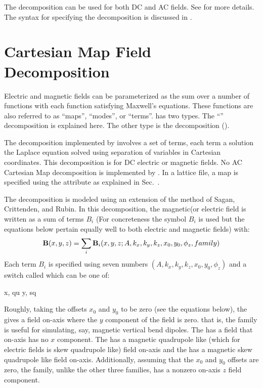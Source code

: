 The  decomposition can be used for both DC and AC fields. See
 for more details. The syntax for specifying the
 decomposition is discussed in .

\section{Cartesian Map Field Decomposition}
\label{s:cart.map.phys}

Electric and magnetic fields can be parameterized as the sum over a number of functions
with each function satisfying Maxwell's equations. These functions are also referred to as
``maps'', ``modes'', or ``terms''. \bmad has two types. The ``''
decomposition is explained here. The other type is the  decomposition
().

The  decomposition implemented by \bmad involves a set of terms, each
term a solution the Laplace equation solved using separation of variables in Cartesian
coordinates. This decomposition is for DC electric or magnetic fields. No AC Cartesian Map
decomposition is implemented by \bmad. In a lattice file, a  map is specified using
the  attribute as explained in Sec.~.

The  decomposition is modeled using an extension of the method of Sagan,
Crittenden, and Rubin\cite{b:wiggler}. In this decomposition, the magnetic(or electric
field is written as a sum of terms $B_i$ (For concreteness the symbol $B_i$ is used but
the equations below pertain equally well to both electric and magnetic fields) with:
\begin{equation}
  {\bf B}(x,y,z) = \sum_i {\bf B}_i(x, y, z; A, k_x, k_y, k_z, x_0, y_0, \phi_z, family)
\end{equation}
Each term $B_i$ is specified using seven numbers $(A, k_x, k_y, k_z,
x_0, y_0, \phi_z)$ and a switch called  which can be one of:
\begin{example}
  x,  qu
  y,  sq
\end{example}
Roughly, taking the offsets $x_0$ and $y_0$ to be zero (see the equations below), the 
 gives a field on-axis where the $y$ component of the field is zero. that is, the 
family is useful for simulating, say, magnetic vertical bend dipoles. The   has a
field that on-axis has no $x$ component. The   has a magnetic quadrupole like
(which for electric fields is skew quadrupole like) field on-axis and the   has a
magnetic skew quadrupole like field on-axis. Additionally, assuming that the $x_0$ and $y_0$ offsets
are zero, the  family, unlike the other three families, has a nonzero on-axis $z$ field
component.

